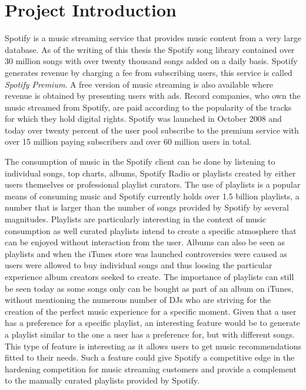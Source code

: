 \documentclass[a4paper,11pt]{kth-mag}
\begin{document}
\section{Project Introduction}
Spotify is a music streaming service that provides music content from a very large database. As of the writing of this thesis the Spotify song library contained over 30 million songs with over twenty thousand songs added on a daily basis\cite{spotifyPress}. Spotify generates revenue by charging a fee from subscribing users, this service is called \textit{Spotify Premium}. A free version of music streaming is also available where revenue is obtained by presenting users with ads. Record companies, who own the music streamed from Spotify, are paid according to the popularity of the tracks for which they hold digital rights. Spotify was launched in October 2008 and today over twenty percent of the user pool subscribe to the premium service with over 15 million paying subscribers and over 60 million users in total\cite{spotifyPress}.

The consumption of music in the Spotify client can be done by listening to individual songs, top charts, albums, Spotify Radio or playlists created by either users themselves or professional playlist curators. The use of playlists is a popular means of consuming music and Spotify currently holds over 1.5 billion playlists, a number that is larger than the number of songs provided by Spotify by several magnitudes\cite{spotifyPress}. Playlists are particularly interesting in the context of music consumption as well curated playlists intend to create a specific atmosphere that can be enjoyed without interaction from the user. Albums can also be seen as playlists and when the iTunes store was launched controversies were caused as users were allowed to buy individual songs and thus loosing the particular experience album creators seeked to create. The importance of playlists can still be seen today as some songs only can be bought as part of an album on iTunes, without mentioning the numerous number of DJs who are striving for the creation of the perfect music experience for a specific moment. 
Given that a user has a preference for a specific playlist, an interesting feature would be to generate a playlist similar to the one a user has a preference for, but with different songs. This type of feature is interesting as it allows users to get music recommendations fitted to their needs. Such a feature could give Spotify a competitive edge in the hardening competition for music streaming customers and provide a complement to the manually curated playlists provided by Spotify.
\end{document}
